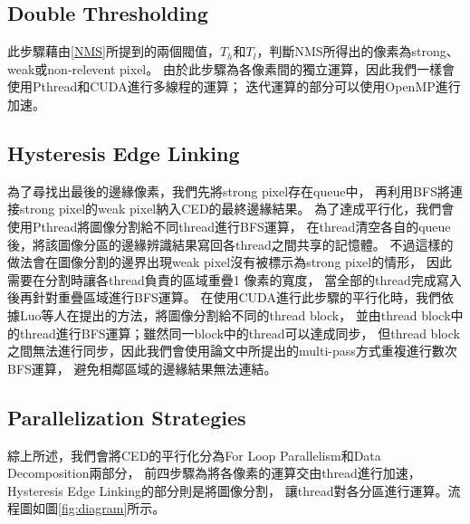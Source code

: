 \documentclass[sigconf,nonacm]{acmart}
\begin{document}
\subsection{Double Thresholding}

此步驟藉由\ref{NMS}所提到的兩個閥值，$T_h$和$T_l$，判斷NMS所得出的像素為strong、weak或non-relevent pixel。
由於此步驟為各像素間的獨立運算，因此我們一樣會使用Pthread和CUDA進行多線程的運算；
迭代運算的部分可以使用OpenMP進行加速。

\subsection{Hysteresis Edge Linking}

為了尋找出最後的邊緣像素，我們先將strong pixel存在queue中，
再利用BFS將連接strong pixel的weak pixel納入CED的最終邊緣結果。
為了達成平行化，我們會使用Pthread將圖像分割給不同thread進行BFS運算，
在thread清空各自的queue後，將該圖像分區的邊緣辨識結果寫回各thread之間共享的記憶體。
不過這樣的做法會在圖像分割的邊界出現weak pixel沒有被標示為strong pixel的情形，
因此需要在分割時讓各thread負責的區域重疊1 像素的寬度，
當全部的thread完成寫入後再針對重疊區域進行BFS運算。
在使用CUDA進行此步驟的平行化時，我們依據Luo等人在\cite{4563088}提出的方法，將圖像分割給不同的thread block，
並由thread block中的thread進行BFS運算；雖然同一block中的thread可以達成同步，
但thread block之間無法進行同步，因此我們會使用論文中所提出的multi-pass方式重複進行數次BFS運算，
避免相鄰區域的邊緣結果無法連結。

\subsection{Parallelization Strategies}

綜上所述，我們會將CED的平行化分為For Loop Parallelism和Data Decomposition兩部分，
前四步驟為將各像素的運算交由thread進行加速，Hysteresis Edge Linking的部分則是將圖像分割，
讓thread對各分區進行運算。流程圖如圖\ref{fig:diagram}所示。
\end{document}
